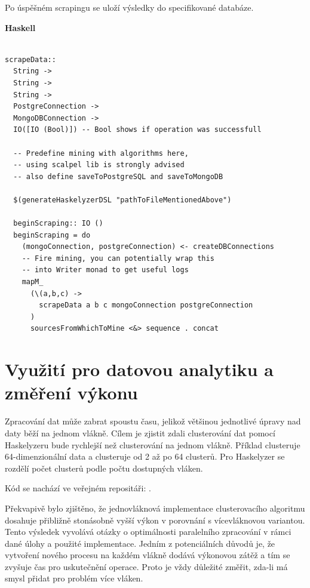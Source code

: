 \documentclass[male,czech]{kithesis}
\begin{document}
Po úspěšném scrapingu se uloží výsledky do specifikované databáze.

\textbf{Haskell}
\begin{verbatim}

scrapeData:: 
  String -> 
  String -> 
  String -> 
  PostgreConnection -> 
  MongoDBConnection -> 
  IO([IO (Bool)]) -- Bool shows if operation was successfull

  -- Predefine mining with algorithms here, 
  -- using scalpel lib is strongly advised
  -- also define saveToPostgreSQL and saveToMongoDB

  $(generateHaskelyzerDSL "pathToFileMentionedAbove")

  beginScraping:: IO ()
  beginScraping = do
    (mongoConnection, postgreConnection) <- createDBConnections
    -- Fire mining, you can potentially wrap this 
    -- into Writer monad to get useful logs
    mapM_ 
      (\(a,b,c) -> 
        scrapeData a b c mongoConnection postgreConnection
      ) 
      sourcesFromWhichToMine <&> sequence . concat
\end{verbatim}

\section{Využití pro datovou analytiku a změření výkonu}
 
Zpracování dat může zabrat spoustu času, 
jelikož většinou jednotlivé úpravy nad daty běží na jednom vlákně.
Cílem je zjistit zdali clusterování dat pomocí 
Haskelyzeru bude rychlejší než clusterování na jednom vlákně.
Příklad clusteruje 64-dimenzionální data a clusteruje 
od 2 až po 64 clusterů. 
Pro Haskelyzer se rozdělí počet clusterů podle počtu dostupných vláken.

Kód se nachází ve veřejném repositáři: \cite{ClusteringExample}.

Překvapivě bylo zjištěno, 
že jednovláknová implementace clusterovacího algoritmu 
dosahuje přibližně stonásobně vyšší výkon v porovnání s vícevláknovou variantou. 
Tento výsledek vyvolává otázky o optimálnosti paralelního zpracování v rámci dané úlohy 
a použité implementace.
Jedním z potenciálních důvodů je, 
že vytvoření nového procesu na každém vlákně dodává výkonovou zátěž
a tím se zvyšuje čas pro uskutečnění operace.
Proto je vždy důležité změřit, 
zda-li má smysl přidat pro problém více vláken.

{\centering
{}
}
\end{document}
